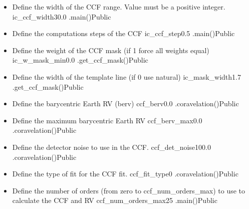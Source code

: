 \begin{itemize}

\item {}
{Define the width of the CCF range. Value must be a positive integer.}
{ic\_ccf\_width}{30.0}
{\calCCF}{\constantsfile}{\calCCF.main()}{Public}


\item {}
{Define the computations steps of the CCF }
{ic\_ccf\_step}{0.5}
{\calCCF}{\constantsfile}{\calCCF.main()}{Public}


\item {}
{Define the weight of the CCF mask (if 1 force all weights equal)}
{ic\_w\_mask\_min}{0.0}
{\calCCF}{\constantsfile}{\spirouRV.get\_ccf\_mask()}{Public}


\item {}
{Define the width of the template line (if 0 use natural)}
{ic\_mask\_width}{1.7}
{\calCCF}{\constantsfile}{\spirouRV.get\_ccf\_mask()}{Public}


\item {}
{Define the barycentric Earth RV (berv)}
{ccf\_berv}{0.0}
{\calCCF}{\constantsfile}{\spirouRV.coravelation()}{Public}


\item {}
{Define the maximum barycentric Earth RV }
{ccf\_berv\_max}{0.0}
{\calCCF}{\constantsfile}{\spirouRV.coravelation()}{Public}


\item {}
{Define the detector noise to use in the CCF.}
{ccf\_det\_noise}{100.0}
{\calCCF}{\constantsfile}{\spirouRV.coravelation()}{Public}


\item {}
{Define the type of fit for the CCF fit.}
{ccf\_fit\_type}{0}
{\calCCF}{\constantsfile}{\spirouRV.coravelation()}{Public}


\item {}
{Define the number of orders (from zero to ccf\_num\_orders\_max) to use to calculate the CCF and RV}
{ccf\_num\_orders\_max}{25}
{\calCCF}{\constantsfile}{\calCCF.main()}{Public}

\end{itemize}



